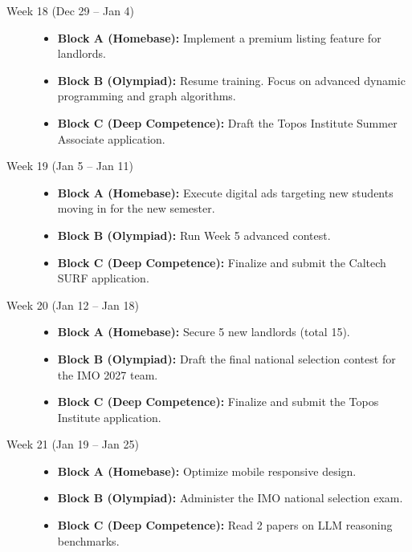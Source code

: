 \documentclass[11pt,a4paper]{article}
\begin{document}
\begin{description}
    \item[Week 18 (Dec 29 -- Jan 4)] \hfill
    \begin{itemize}
        \item \textbf{Block A (Homebase):} Implement a premium listing feature for landlords.
        \item \textbf{Block B (Olympiad):} Resume training. Focus on advanced dynamic programming and graph algorithms.
        \item \textbf{Block C (Deep Competence):} Draft the Topos Institute Summer Associate application.
    \end{itemize}
    
    \item[Week 19 (Jan 5 -- Jan 11)] \hfill
    \begin{itemize}
        \item \textbf{Block A (Homebase):} Execute digital ads targeting new students moving in for the new semester.
        \item \textbf{Block B (Olympiad):} Run Week 5 advanced contest.
        \item \textbf{Block C (Deep Competence):} Finalize and submit the Caltech SURF application.
    \end{itemize}
    
    \item[Week 20 (Jan 12 -- Jan 18)] \hfill
    \begin{itemize}
        \item \textbf{Block A (Homebase):} Secure 5 new landlords (total 15).
        \item \textbf{Block B (Olympiad):} Draft the final national selection contest for the IMO 2027 team.
        \item \textbf{Block C (Deep Competence):} Finalize and submit the Topos Institute application.
    \end{itemize}
    
    \item[Week 21 (Jan 19 -- Jan 25)] \hfill
    \begin{itemize}
        \item \textbf{Block A (Homebase):} Optimize mobile responsive design.
        \item \textbf{Block B (Olympiad):} Administer the IMO national selection exam.
        \item \textbf{Block C (Deep Competence):} Read 2 papers on LLM reasoning benchmarks.
    \end{itemize}
\end{description}
\end{document}

